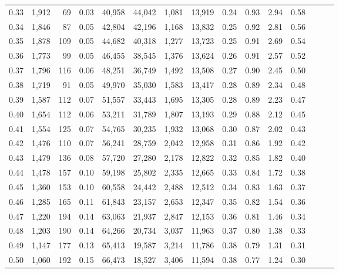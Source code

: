 \begin{tabular}{rrrrrrrrrrrrrrr}
0.33 &  1,912 &   69 &  0.03 &  40,958 &  44,042 &   1,081 &  13,919 &  0.24 &  0.93 &  2.94 &      0.58 \\
0.34 &  1,846 &   87 &  0.05 &  42,804 &  42,196 &   1,168 &  13,832 &  0.25 &  0.92 &  2.81 &      0.56 \\
0.35 &  1,878 &  109 &  0.05 &  44,682 &  40,318 &   1,277 &  13,723 &  0.25 &  0.91 &  2.69 &      0.54 \\
0.36 &  1,773 &   99 &  0.05 &  46,455 &  38,545 &   1,376 &  13,624 &  0.26 &  0.91 &  2.57 &      0.52 \\
0.37 &  1,796 &  116 &  0.06 &  48,251 &  36,749 &   1,492 &  13,508 &  0.27 &  0.90 &  2.45 &      0.50 \\
0.38 &  1,719 &   91 &  0.05 &  49,970 &  35,030 &   1,583 &  13,417 &  0.28 &  0.89 &  2.34 &      0.48 \\
0.39 &  1,587 &  112 &  0.07 &  51,557 &  33,443 &   1,695 &  13,305 &  0.28 &  0.89 &  2.23 &      0.47 \\
0.40 &  1,654 &  112 &  0.06 &  53,211 &  31,789 &   1,807 &  13,193 &  0.29 &  0.88 &  2.12 &      0.45 \\
0.41 &  1,554 &  125 &  0.07 &  54,765 &  30,235 &   1,932 &  13,068 &  0.30 &  0.87 &  2.02 &      0.43 \\
0.42 &  1,476 &  110 &  0.07 &  56,241 &  28,759 &   2,042 &  12,958 &  0.31 &  0.86 &  1.92 &      0.42 \\
0.43 &  1,479 &  136 &  0.08 &  57,720 &  27,280 &   2,178 &  12,822 &  0.32 &  0.85 &  1.82 &      0.40 \\
0.44 &  1,478 &  157 &  0.10 &  59,198 &  25,802 &   2,335 &  12,665 &  0.33 &  0.84 &  1.72 &      0.38 \\
0.45 &  1,360 &  153 &  0.10 &  60,558 &  24,442 &   2,488 &  12,512 &  0.34 &  0.83 &  1.63 &      0.37 \\
0.46 &  1,285 &  165 &  0.11 &  61,843 &  23,157 &   2,653 &  12,347 &  0.35 &  0.82 &  1.54 &      0.36 \\
0.47 &  1,220 &  194 &  0.14 &  63,063 &  21,937 &   2,847 &  12,153 &  0.36 &  0.81 &  1.46 &      0.34 \\
0.48 &  1,203 &  190 &  0.14 &  64,266 &  20,734 &   3,037 &  11,963 &  0.37 &  0.80 &  1.38 &      0.33 \\
0.49 &  1,147 &  177 &  0.13 &  65,413 &  19,587 &   3,214 &  11,786 &  0.38 &  0.79 &  1.31 &      0.31 \\
0.50 &  1,060 &  192 &  0.15 &  66,473 &  18,527 &   3,406 &  11,594 &  0.38 &  0.77 &  1.24 &      0.30 \\

\end{tabular}
